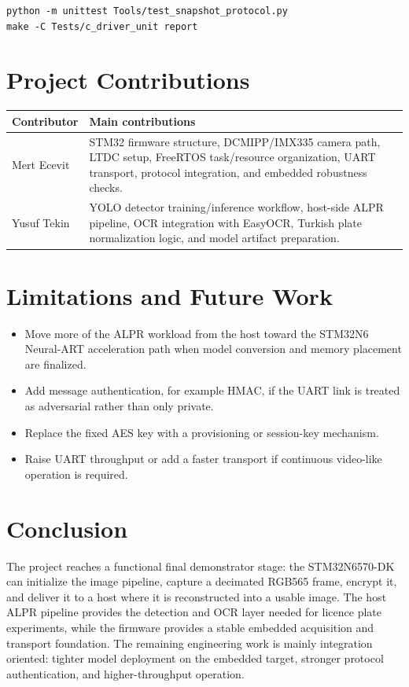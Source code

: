 \documentclass[11pt,a4paper]{article}
\begin{document}
\begin{lstlisting}[caption={Commands used to generate host and C driver unit test evidence.}]
python -m unittest Tools/test_snapshot_protocol.py
make -C Tests/c_driver_unit report
\end{lstlisting}

\section{Project Contributions}
\begin{tabularx}{\textwidth}{@{}lX@{}}
\toprule
\textbf{Contributor} & \textbf{Main contributions} \\
\midrule
Mert Ecevit & STM32 firmware structure, DCMIPP/IMX335 camera path, LTDC setup, FreeRTOS task/resource organization, UART transport, protocol integration, and embedded robustness checks. \\
Yusuf Tekin & YOLO detector training/inference workflow, host-side ALPR pipeline, OCR integration with EasyOCR, Turkish plate normalization logic, and model artifact preparation. \\
\bottomrule
\end{tabularx}

\section{Limitations and Future Work}
\begin{itemize}[noitemsep]
  \item Move more of the ALPR workload from the host toward the STM32N6 Neural-ART acceleration path when model conversion and memory placement are finalized.
  \item Add message authentication, for example HMAC, if the UART link is treated as adversarial rather than only private.
  \item Replace the fixed AES key with a provisioning or session-key mechanism.
  \item Raise UART throughput or add a faster transport if continuous video-like operation is required.
\end{itemize}

\section{Conclusion}
The project reaches a functional final demonstrator stage: the STM32N6570-DK can
initialize the image pipeline, capture a decimated RGB565 frame, encrypt it, and
deliver it to a host where it is reconstructed into a usable image. The host
ALPR pipeline provides the detection and OCR layer needed for licence plate
experiments, while the firmware provides a stable embedded acquisition and
transport foundation. The remaining engineering work is mainly integration
oriented: tighter model deployment on the embedded target, stronger protocol
authentication, and higher-throughput operation.
\end{document}
